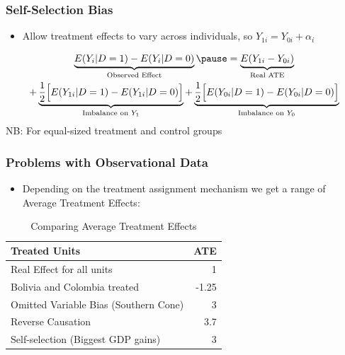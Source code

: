 \documentclass[xcolor=x11names,compress]{beamer}\usepackage[]{graphicx}\usepackage[]{color}
\renewcommand{\(}{\begin{columns}}
\renewcommand{\)}{\end{columns}}
\newcommand{\<}[1]{\begin{column}{#1}}
\renewcommand{\>}{\end{column}}
\begin{document}
\begin{frame}
\frametitle{Self-Selection Bias}
\begin{itemize}
\item Allow treatment effects to vary across individuals, so $Y_{1i} = Y_{0i} + \alpha_i$
\end{itemize}
\pause
\begin{multline}
\underbrace{E(Y_i|D=1)-E(Y_i|D=0)}_\text{Observed Effect} \pause = \underbrace{E(Y_{1i} - Y_{0i})}_\text{Real ATE} \\ + \underbrace{\frac{1}{2}\Big[ E(Y_{1i}|D=1) - E(Y_{1i}|D=0) \Big]}_\text{Imbalance on $Y_1$} + \underbrace{\frac{1}{2}\Big[ E(Y_{0i}|D=1) - E(Y_{0i}|D=0) \Big]}_\text{Imbalance on $Y_0$}
\end{multline}
\footnotesize
NB: For equal-sized treatment and control groups
\normalsize
\end{frame}

\begin{frame}
\frametitle{Problems with Observational Data}
\begin{itemize}
\item Depending on the treatment assignment mechanism we get a range of Average Treatment Effects:
\end{itemize}
\begin{table}[htbp]
  \centering
  \caption{Comparing Average Treatment Effects}
    \begin{tabular}{|l|r|}
    \hline
    \textbf{Treated Units} & \multicolumn{1}{l|}{\textbf{ATE}} \bigstrut\\
    \hline
    Real Effect for all units & 1 \bigstrut\\
    \hline
    Bolivia and Colombia treated & -1.25 \bigstrut\\
    \hline
    Omitted Variable Bias (Southern Cone) & 3 \bigstrut\\
    \hline
    Reverse Causation & 3.7 \bigstrut\\
    \hline
    Self-selection (Biggest GDP gains) & 3 \bigstrut\\
    \hline
    \end{tabular}%
\end{table}%
\end{frame}
\end{document}
